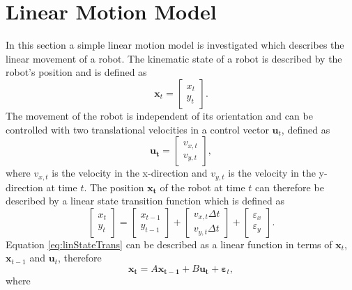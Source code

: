 \documentclass[12pt,oneside,openany,a4paper, %
afrikaans,english,
]{memoir}
\numberwithin{equation}{chapter}
\begin{document}
{\section{Linear Motion Model}\label{sec:linearMotionModel}
In this section a simple linear motion model is investigated which describes the linear movement of a robot. The kinematic state of a robot is described by the robot's position and is defined as
\begin{equation}
\bm{x}_t =
\begin{bmatrix}
x_t\\
y_t
\end{bmatrix}.
\end{equation}
The movement of the robot is independent of its orientation and can be controlled with two translational velocities in a control vector  $\bm{u}_t$, defined as
\begin{equation}
\bm{u_t} = 
\begin{bmatrix}
v_{x,t}\\
v_{y,t}
\end{bmatrix},
\end{equation}
where $v_{x,t}$ is the velocity in the x-direction and $v_{y,t}$ is the velocity in the y-direction at time $t$. The position $\bm{x_t}$ of the robot at time $t$ can therefore be described by a linear state transition function which is defined as
\begin{equation}\label{eq:linStateTrans}
\begin{bmatrix}
x_t\\
y_t
\end{bmatrix}
=
\begin{bmatrix}
x_{t-1}\\
y_{t-1}
\end{bmatrix}
+
\begin{bmatrix}
v_{x,t} \Delta t \\
v_{y,t} \Delta t
\end{bmatrix}
+
\begin{bmatrix}
\varepsilon_x \\
\varepsilon_y
\end{bmatrix}.
\end{equation}
Equation \ref{eq:linStateTrans} can be described as a linear function in terms of $\bm{x}_t$, $\bm{x}_{t-1}$ and $\bm{u}_t$, therefore
\begin{equation}\label{eq:lineartrans}
\bm{x_t} = A \bm{x_{t - 1}} + B \bm{u_t} + \bm{\varepsilon}_t,
\end{equation}
where
\begin{equation}

\end{equation}}
\end{document}
